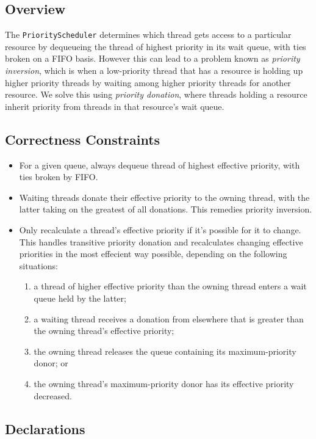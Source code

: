 \documentclass{article}
\begin{document}
\subsection{Overview}
The \texttt{PriorityScheduler} determines which thread gets access to a particular resource by dequeueing the thread of highest priority in its wait queue, with ties broken on a FIFO basis. However this can lead to a problem known as \textit{priority inversion}, which is when a low-priority thread that has a resource is holding up higher priority threads by waiting among higher priority threads for another resource. We solve this using \textit{priority donation}, where threads holding a resource inherit priority from threads in that resource's wait queue.

\subsection{Correctness Constraints}
\begin{itemize}
\item For a given queue, always dequeue thread of highest effective priority, with ties broken by FIFO.
\item Waiting threads donate their effective priority to the owning thread, with the latter taking on the greatest of all donations. This remedies priority inversion.
\item Only recalculate a thread's effective priority if it's possible for it to change. This handles transitive priority donation and recalculates changing effective priorities in the most effecient way possible, depending on the following situations:
\begin{enumerate}[1.]
\item a thread of higher effective priority than the owning thread enters a wait queue held by the latter;
\item a waiting thread receives a donation from elsewhere that is greater than the owning thread's effective priority;
\item the owning thread releases the queue containing its maximum-priority donor; or
\item \textcolor{\changecolor}{the owning thread's maximum-priority donor has its effective priority decreased.}
\end{enumerate}
\end{itemize}

\subsection{Declarations} %
\end{document}
